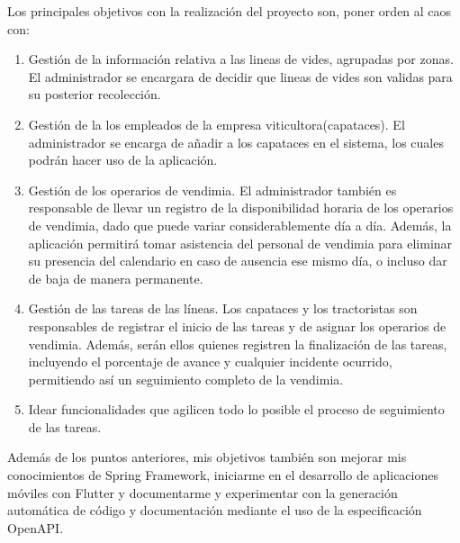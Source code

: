 Los principales objetivos con la realización del proyecto son, poner orden al caos con:
\begin{enumerate}
  \item Gestión de la información relativa a las lineas de vides, agrupadas por zonas. El administrador se encargara de decidir que lineas de vides son validas para su posterior recolección.
  \item Gestión de la los empleados de la empresa viticultora(capataces). El administrador se encarga de añadir a los capataces en el sistema, los cuales podrán hacer uso de la aplicación.
  \item Gestión de los operarios de vendimia. El administrador también es responsable de llevar un registro de la disponibilidad horaria de los operarios de vendimia, dado que puede variar considerablemente día a día. 
  Además, la aplicación permitirá tomar asistencia del personal de vendimia para eliminar su presencia del calendario en caso de ausencia ese mismo día, o incluso dar de baja de manera permanente.
  \item Gestión de las tareas de las líneas. Los capataces y los tractoristas son responsables de registrar el inicio de las tareas y de asignar los operarios de vendimia. 
  Además, serán ellos quienes registren la finalización de las tareas, incluyendo el porcentaje de avance y cualquier incidente ocurrido, permitiendo así un seguimiento completo de la vendimia.
  \item Idear funcionalidades que agilicen todo lo posible el proceso de seguimiento de las tareas.
\end{enumerate}

Además de los puntos anteriores, mis objetivos también son mejorar mis conocimientos de Spring Framework, iniciarme en el desarrollo de aplicaciones móviles con Flutter 
y documentarme y experimentar con la generación automática de código y documentación mediante el uso de la especificación OpenAPI.







